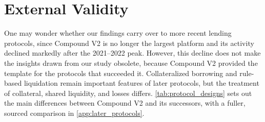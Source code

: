\documentclass[a4paper,UKenglish,cleveref, autoref, thm-restate]{informs3}
\newcommand{\rev}[1]{{\color{purple}#1}}
\DeclareRobustCommand{\latestrev}[1]{{\color{red}\hypersetup{linkcolor=red,citecolor=red,urlcolor=red}#1}}
\begin{document}


\section{\rev{External Validity}}
\label{sec:external_validity}

\rev{One may wonder whether our findings carry over to more recent
lending protocols, since Compound V2 is no longer the largest platform and its
activity declined markedly after the 2021--2022 peak. However, this decline does not make the insights drawn
from our study obsolete, because Compound V2 provided the template for
the protocols that succeeded it. \latestrev{Collateralized borrowing and rule-based liquidation remain important features of later protocols, but the treatment of collateral, shared liquidity, and losses differs.} \autoref{tab:protocol_designs} sets out the main differences
between Compound V2 and its successors, \latestrev{with a fuller, sourced comparison in \ref{app:later_protocols}}.}
\end{document}
